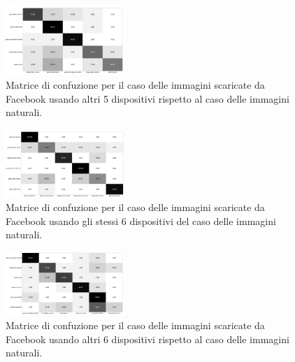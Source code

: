 \begin{figure}[h]
\begin{center}
\includegraphics[width=0.4\textwidth]{images/confusion_matrix_fb_highres_5_bis.png}
\end{center}
  \caption{Matrice di confuzione per il caso delle immagini scaricate da Facebook usando altri 5 dispositivi rispetto al caso delle immagini naturali. }
\label{fig:validation}
\end{figure}

\begin{figure}[h]
\begin{center}
\includegraphics[width=0.4\textwidth]{images/confusion_matrix_fb_highres_6.png}
\end{center}
  \caption{Matrice di confuzione per il caso delle immagini scaricate da Facebook usando gli stessi 6 dispositivi del caso delle immagini naturali.}
\label{fig:validation}
\end{figure}

\begin{figure}[h]
\begin{center}
\includegraphics[width=0.4\textwidth]{images/confusion_matrix_fb_highres_6_bis.png}
\end{center}
  \caption{Matrice di confuzione per il caso delle immagini scaricate da Facebook usando altri 6 dispositivi rispetto al caso delle immagini naturali. }
\label{fig:validation}
\end{figure}

